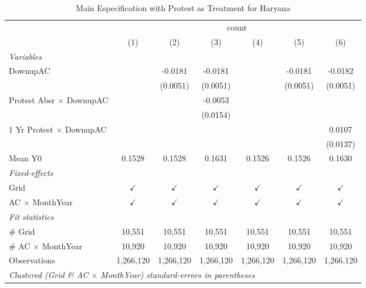 
\begin{table}[htbp]
   \caption{\label{tab:protest_treat_main_pj} Main Especification with Protest as Treatment for Haryana}
   \centering
   \begin{tabular}{lcccccc}
      \tabularnewline \midrule \midrule
       & \multicolumn{6}{c}{count}\\
                                       & (1)           & (2)           & (3)           & (4)           & (5)           & (6)\\  
      \midrule
      \emph{Variables}\\
      DownupAC                         &               & -0.0181       & -0.0181       &               & -0.0181       & -0.0182\\   
                                       &               & (0.0051)      & (0.0051)      &               & (0.0051)      & (0.0051)\\   
      Protest Absr $\times$ DownupAC   &               &               & -0.0053       &               &               &   \\   
                                       &               &               & (0.0154)      &               &               &   \\   
      1 Yr Protest $\times$ DownupAC   &               &               &               &               &               & 0.0107\\   
                                       &               &               &               &               &               & (0.0137)\\   
      Mean Y0                          & 0.1528        & 0.1528        & 0.1631        & 0.1526        & 0.1526        & 0.1630\\  
      \midrule
      \emph{Fixed-effects}\\
      Grid                             & $\checkmark$  & $\checkmark$  & $\checkmark$  & $\checkmark$  & $\checkmark$  & $\checkmark$\\   
      AC $\times$ MonthYear            & $\checkmark$  & $\checkmark$  & $\checkmark$  & $\checkmark$  & $\checkmark$  & $\checkmark$\\   
      \midrule
      \emph{Fit statistics}\\
      \# Grid                          & 10,551        & 10,551        & 10,551        & 10,551        & 10,551        & 10,551\\  
      \# AC $\times$ MonthYear         & 10,920        & 10,920        & 10,920        & 10,920        & 10,920        & 10,920\\  
      Observations                     & 1,266,120     & 1,266,120     & 1,266,120     & 1,266,120     & 1,266,120     & 1,266,120\\  
      \midrule \midrule
      \multicolumn{7}{l}{\emph{Clustered (Grid \& AC $\times$ MonthYear) standard-errors in parentheses}}\\
   \end{tabular}
\end{table}


